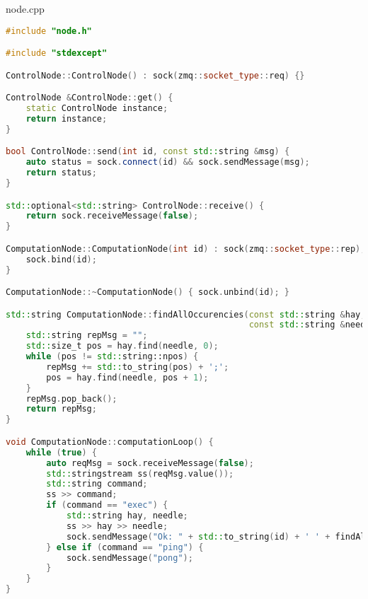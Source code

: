 \documentclass[a4paper, 12pt]{article}
\begin{document}
node.cpp
\begin{lstlisting}[language=C++]
#include "node.h"

#include "stdexcept"

ControlNode::ControlNode() : sock(zmq::socket_type::req) {}

ControlNode &ControlNode::get() {
    static ControlNode instance;
    return instance;
}

bool ControlNode::send(int id, const std::string &msg) {
    auto status = sock.connect(id) && sock.sendMessage(msg);
    return status;
}

std::optional<std::string> ControlNode::receive() {
    return sock.receiveMessage(false);
}

ComputationNode::ComputationNode(int id) : sock(zmq::socket_type::rep), id(id) {
    sock.bind(id);
}

ComputationNode::~ComputationNode() { sock.unbind(id); }

std::string ComputationNode::findAllOccurencies(const std::string &hay,
                                                const std::string &needle) {
    std::string repMsg = "";
    std::size_t pos = hay.find(needle, 0);
    while (pos != std::string::npos) {
        repMsg += std::to_string(pos) + ';';
        pos = hay.find(needle, pos + 1);
    }
    repMsg.pop_back();
    return repMsg;
}

void ComputationNode::computationLoop() {
    while (true) {
        auto reqMsg = sock.receiveMessage(false);
        std::stringstream ss(reqMsg.value());
        std::string command;
        ss >> command;
        if (command == "exec") {
            std::string hay, needle;
            ss >> hay >> needle;
            sock.sendMessage("Ok: " + std::to_string(id) + ' ' + findAllOccurencies(hay, needle));
        } else if (command == "ping") {
            sock.sendMessage("pong");
        }
    }
}

\end{lstlisting}
\end{document}

